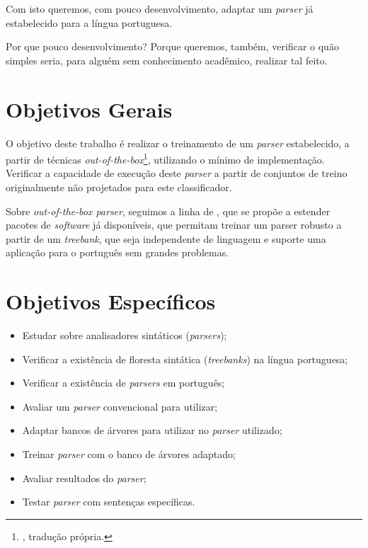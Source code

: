 Com isto queremos, com pouco desenvolvimento, adaptar um \textit{parser} já estabelecido para a língua portuguesa. 

Por que pouco desenvolvimento? Porque queremos, também, verificar o quão simples seria, para alguém sem conhecimento acadêmico, realizar tal feito.


\section{Objetivos Gerais}
\label{sec:objetivos-gerais}

O objetivo deste trabalho é realizar o treinamento de um \textit{parser} estabelecido, a partir de técnicas \textit{out-of-the-box}\footnote{, tradução própria.}, utilizando o mínimo de implementação. Verificar a capacidade de execução deste \textit{parser} a partir de conjuntos de treino originalmente não projetados para este classificador.

Sobre \textit{out-of-the-box parser}, seguimos a linha de , que se propõe a estender pacotes de \textit{software} já disponíveis, que permitam treinar um parser robusto a partir de um \textit{treebank}, que seja independente de linguagem e suporte uma aplicação para o português sem grandes problemas.

\section{Objetivos Específicos}\label{sec:objetivos-especificos}
\begin{itemize}
    \item Estudar sobre analisadores sintáticos (\textit{parsers});
    \item Verificar a existência de floresta sintática (\textit{treebanks}) na língua portuguesa;
    \item Verificar a existência de \textit{parsers} em português;
    \item Avaliar um \textit{parser} convencional para utilizar;
    \item Adaptar bancos de árvores para utilizar no \textit{parser} utilizado;
    \item Treinar \textit{parser} com o banco de árvores adaptado;
    \item Avaliar resultados do \textit{parser};
    \item Testar \textit{parser} com sentenças específicas.
    
\end{itemize}


